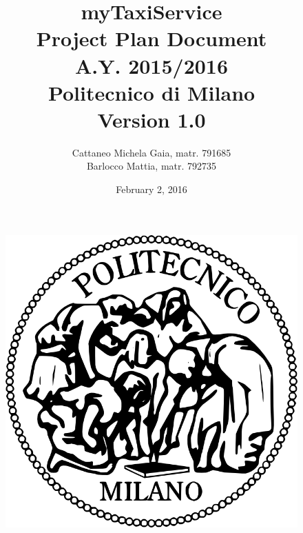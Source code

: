 \documentclass[18pt,oneside,a4paper, titlepage]{article}
\begin{document}
\begin{figure}[t]
	\centering
	\includegraphics[scale=0.35]{logo-polimi.png}
\end{figure}
\title{\textbf{myTaxiService}\\\textbf{P}roject \textbf{P}lan \textbf{D}ocument\\ A.Y. 2015/2016\\
	Politecnico di Milano\\ Version 1.0}	
\author{Cattaneo Michela Gaia, matr. 791685\\Barlocco Mattia, matr. 792735 }
\date{February 2, 2016}
\maketitle

\newpage
\tableofcontents

\newpage
	

\newpage
	
\newpage
\end{document}
